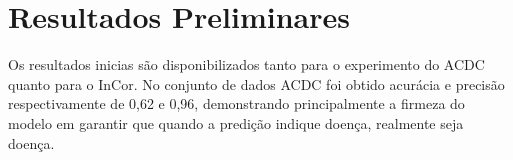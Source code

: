 \chapter{Resultados  Preliminares}
\label{chap:resultados_discussao}

Os resultados inicias são disponibilizados tanto para o experimento do \gls{ACDC} quanto para o \gls{InCor}. No conjunto de dados \gls{ACDC} foi obtido acurácia e precisão respectivamente de 0,62 e 0,96, demonstrando principalmente a firmeza do modelo em garantir que quando a predição indique doença, realmente seja doença.




